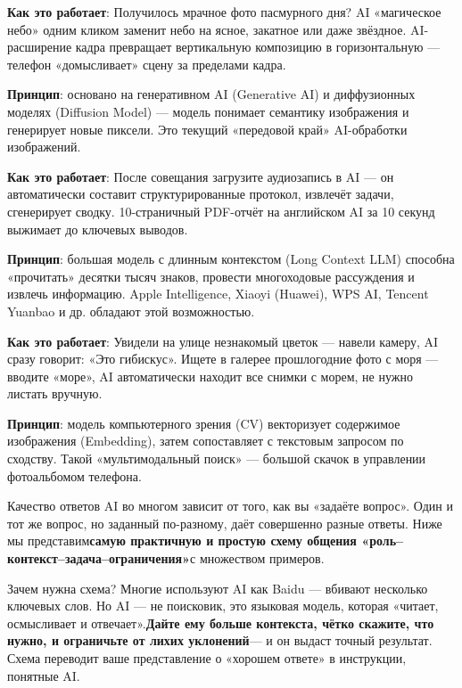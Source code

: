
\textbf{Как это работает}: Получилось мрачное фото пасмурного дня? AI «магическое небо» одним кликом заменит небо на ясное, закатное или даже звёздное. AI-расширение кадра превращает вертикальную композицию в горизонтальную — телефон «домысливает» сцену за пределами кадра.

\textbf{Принцип}: основано на генеративном AI (Generative AI) и диффузионных моделях (Diffusion Model) — модель понимает семантику изображения и генерирует новые пиксели. Это текущий «передовой край» AI-обработки изображений.


\textbf{Как это работает}: После совещания загрузите аудиозапись в AI — он автоматически составит структурированные протокол, извлечёт задачи, сгенерирует сводку. 10-страничный PDF-отчёт на английском AI за 10 секунд выжимает до ключевых выводов.

\textbf{Принцип}: большая модель с длинным контекстом (Long Context LLM) способна «прочитать» десятки тысяч знаков, провести многоходовые рассуждения и извлечь информацию. Apple Intelligence, Xiaoyi (Huawei), WPS AI, Tencent Yuanbao и др. обладают этой возможностью.


\textbf{Как это работает}: Увидели на улице незнакомый цветок — навели камеру, AI сразу говорит: «Это гибискус». Ищете в галерее прошлогодние фото с моря — вводите «море», AI автоматически находит все снимки с морем, не нужно листать вручную.

\textbf{Принцип}: модель компьютерного зрения (CV) векторизует содержимое изображения (Embedding), затем сопоставляет с текстовым запросом по сходству. Такой «мультимодальный поиск» — большой скачок в управлении фотоальбомом телефона.


Качество ответов AI во многом зависит от того, как вы «задаёте вопрос». Один и тот же вопрос, но заданный по-разному, даёт совершенно разные ответы. Ниже мы представим\textbf{самую практичную и простую схему общения «роль–контекст–задача–ограничения»}с множеством примеров.

\begin{tcbinfo}{Зачем нужна схема?}
Многие используют AI как Baidu — вбивают несколько ключевых слов. Но AI — не поисковик, это языковая модель, которая «читает, осмысливает и отвечает».\textbf{Дайте ему больше контекста, чётко скажите, что нужно, и ограничьте от лихих уклонений}— и он выдаст точный результат. Схема переводит ваше представление о «хорошем ответе» в инструкции, понятные AI.

\end{tcbinfo}

